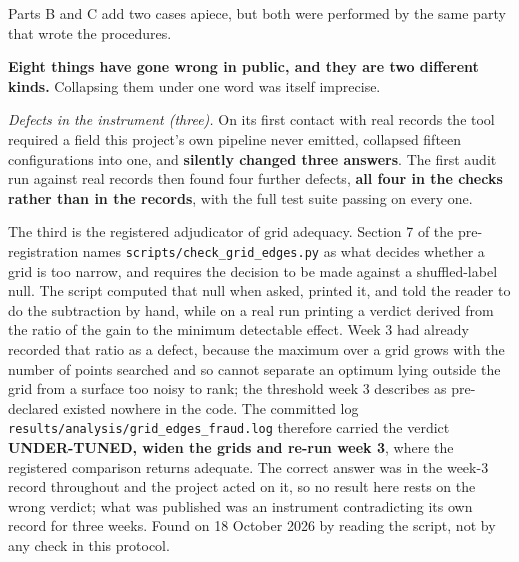 \documentclass[
  10pt,
]{article}
\begin{document}
Parts B and C add two cases apiece, but both were performed by the same
party that wrote the procedures.

\textbf{Eight things have gone wrong in public, and they are two
different kinds.} Collapsing them under one word was itself imprecise.

\emph{Defects in the instrument (three).} On its first contact with real
records the tool required a field this project's own pipeline never
emitted, collapsed fifteen configurations into one, and \textbf{silently
changed three answers}. The first audit run against real records then
found four further defects, \textbf{all four in the checks rather than
in the records}, with the full test suite passing on every one.

The third is the registered adjudicator of grid adequacy. Section 7 of
the pre-registration names \texttt{scripts/\allowbreak{}check\_\allowbreak{}grid\_\allowbreak{}edges.py} as
what decides whether a grid is too narrow, and requires the decision to
be made against a shuffled-label null. The script computed that null
when asked, printed it, and told the reader to do the subtraction by
hand, while on a real run printing a verdict derived from the ratio of
the gain to the minimum detectable effect. Week 3 had already recorded
that ratio as a defect, because the maximum over a grid grows with the
number of points searched and so cannot separate an optimum lying
outside the grid from a surface too noisy to rank; the threshold week 3
describes as pre-declared existed nowhere in the code. The committed log
\texttt{results/\allowbreak{}analysis/\allowbreak{}grid\_\allowbreak{}edges\_\allowbreak{}fraud.log} therefore carried the
verdict \textbf{UNDER-TUNED, widen the grids and re-run week 3}, where
the registered comparison returns adequate. The correct answer was in
the week-3 record throughout and the project acted on it, so no result
here rests on the wrong verdict; what was published was an instrument
contradicting its own record for three weeks. Found on 18 October 2026
by reading the script, not by any check in this protocol.
\end{document}
